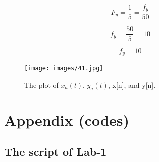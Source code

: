 \documentclass[12pt]{article}
\begin{document}
\begin{enumerate}
\begin{enumerate}
$$F_y = \frac{1}{5} = \frac{f_y}{50}$$

$$f_y = \frac{50}{5} = 10$$


$$\boxed{f_y = 10}$$


\begin{figure}[H]
    \centering
    \begin{minipage}[b]{0.7\textwidth}
        \texttt{[image: images/41.jpg]}
    \end{minipage}
    \caption{The plot of $x_a(t)$, $y_a(t)$, x[n], and y[n].}
    \label{fig:41}
\end{figure}

\end{enumerate}
\end{enumerate}






\newpage
\section{Appendix (codes)}
\subsection{The script of Lab-1}
\end{document}
